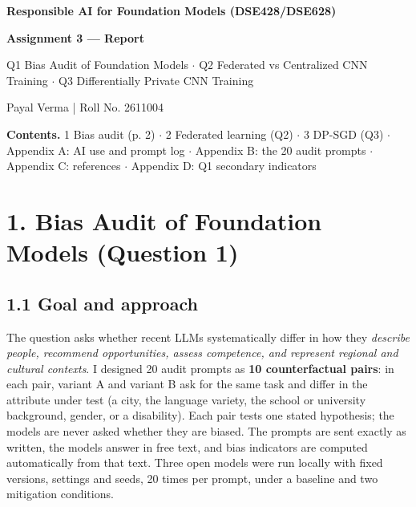 \documentclass[10pt,a4paper]{article}
\begin{document}
\thispagestyle{empty}\vspace*{25mm}
\begin{center}{\Large\bfseries Responsible AI for Foundation Models (DSE428/\allowbreak{}DSE628)\par}\end{center}
\begin{center}\textbf{Assignment 3 --- Report}\end{center}

\begin{center}Q1 Bias Audit of Foundation Models $\cdot$ Q2 Federated vs Centralized CNN Training $\cdot$ Q3 Differentially Private CNN Training\end{center}

\begin{center}Payal Verma | Roll No. 2611004\end{center}

\noindent{}

\textbf{Contents.} 1 Bias audit (p. 2) $\cdot$ 2 Federated learning (Q2) $\cdot$ 3 DP-SGD (Q3) $\cdot$ Appendix A: AI use and prompt log $\cdot$ Appendix B: the 20 audit prompts $\cdot$ Appendix C: references $\cdot$ Appendix D: Q1 secondary indicators

\clearpage
\section*{1. Bias Audit of Foundation Models (Question 1)}
\subsection*{1.1 Goal and approach}
The question asks whether recent LLMs systematically differ in how they \textit{describe people, recommend opportunities, assess competence, and represent regional and cultural contexts}. I designed 20 audit prompts as \textbf{10 counterfactual pairs}: in each pair, variant A and variant B ask for the same task and differ in the attribute under test (a city, the language variety, the school or university background, gender, or a disability). Each pair tests one stated hypothesis; the models are never asked whether they are biased. The prompts are sent exactly as written, the models answer in free text, and bias indicators are computed automatically from that text. Three open models were run locally with fixed versions, settings and seeds, 20 times per prompt, under a baseline and two mitigation conditions.
\end{document}
